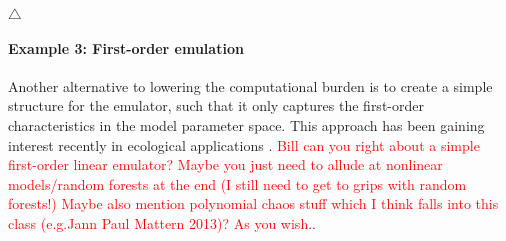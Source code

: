 \documentclass[10pt,a4paper]{article}
\newcommand\xqed[1]{%
  \leavevmode\unskip\penalty9999 \hbox{}\nobreak\hfill
  \quad\hbox{#1}}
\newcommand\demo{\xqed{$\triangle$}}
\newcommand{\red}{\textcolor{red}}
\begin{document}
\demo

\paragraph{Example 3: First-order emulation} Another alternative to lowering the computational burden is to create a simple structure for the emulator, such that it only captures the first-order characteristics in the model parameter space. This approach has been gaining interest recently in ecological applications \citep{Hooten_2011,Leeds_2013}. \red{Bill can you right about a simple first-order linear emulator? Maybe you just need to allude at nonlinear models/random forests at the end (I still need to get to grips with random forests!) Maybe also mention polynomial chaos stuff which I think falls into this class (e.g.Jann Paul Mattern 2013)? As you wish.}. 
\end{document}

